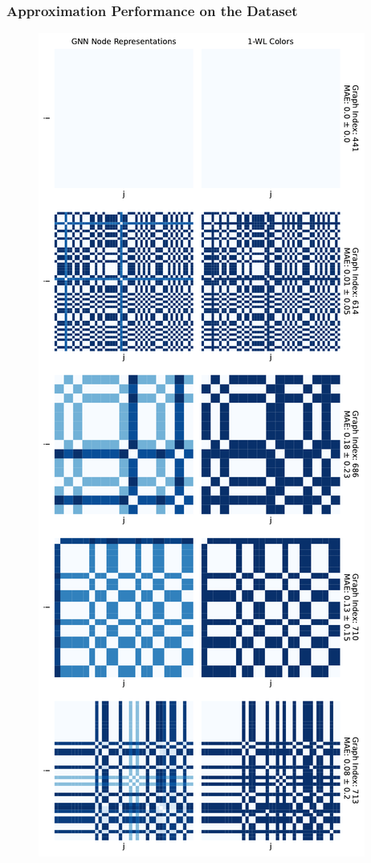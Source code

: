 \subsubsection{Approximation Performance on the \imdb Dataset}
\begin{figure}[H]
    \centering
    \begin{minipage}[b]{0.45992852703\textwidth}
        \centering
        \includegraphics[width=\textwidth, left]{Figures/heatmaps_IMDB-BINARY_0.pdf}

\end{minipage}
\end{figure}
